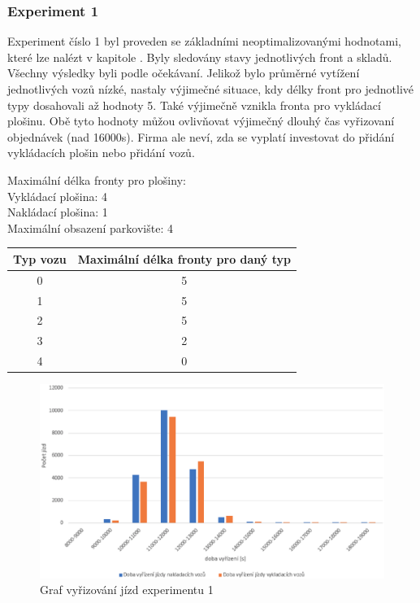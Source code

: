 \documentclass[a4paper, 11pt]{article}
\begin{document}
\subsubsection{Experiment 1}
Experiment číslo 1 byl proveden se základními neoptimalizovanými hodnotami, které lze nalézt v kapitole . Byly sledovány stavy jednotlivých front a skladů. Všechny výsledky byli podle očekávaní. Jelikož bylo průměrné vytížení jednotlivých vozů nízké, nastaly výjimečné situace, kdy délky front pro jednotlivé typy dosahovali až hodnoty 5.
Také výjimečně vznikla fronta pro vykládací plošinu. Obě tyto hodnoty můžou ovlivňovat výjimečný dlouhý čas vyřizovaní objednávek (nad 16000s). Firma ale neví, zda se vyplatí investovat do přidání vykládacích plošin nebo přidání vozů.\\

\begin{center}
\noindent Maximální délka fronty pro plošiny:\\
\indent Vykládací plošina: 4\\
\indent Nakládací plošina: 1\\
Maximální obsazení parkovište: 4\\
\end{center}

\begin{center}
\begin{tabular}[h!]{|c|c|}
\hline
Typ vozu & Maximální délka fronty pro daný typ \\ \hline
0 & 5 \\ \hline
1 & 5 \\ \hline
2 & 5 \\ \hline
3 & 2 \\ \hline
4 & 0 \\ \hline
\end{tabular}
\end{center}

\begin{figure}[h!]
\begin{center}
\includegraphics[scale=0.5]{exp1.eps}
\caption{Graf vyřizování jízd experimentu 1}
\end{center}
\end{figure}
\vspace{20pt}
\end{document}
